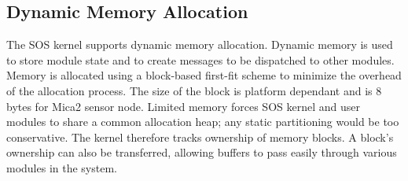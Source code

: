 \subsection{Dynamic Memory Allocation}
% 
The SOS kernel supports dynamic memory allocation.
% 
Dynamic memory is used to store module state and to create messages to
be dispatched to other modules. 
% 
Memory is allocated using a block-based first-fit scheme to minimize
the overhead of the allocation process.
%
The size of the block is platform dependant and is 8 bytes for Mica2
sensor node.
% 
Limited memory forces SOS kernel and user modules to share a common
allocation heap; any static partitioning would be too conservative.
% 
% 
The kernel therefore tracks ownership of memory blocks.
% 
A block's ownership can also be transferred, allowing
% 
buffers to pass easily through various modules in the system.
% 
% 
